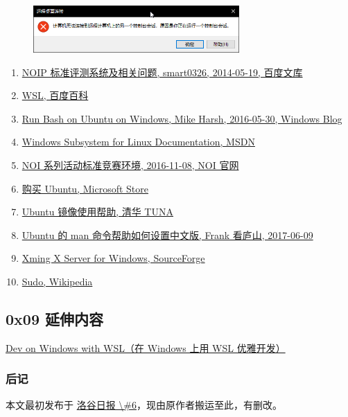 \begin{figure}[htbp]
\centering
\includegraphics[width=0.7\textwidth]{docs/intro/images/WSL12.png} 

\end{figure}



\begin{enumerate}
\item \href{https://wenku.baidu.com/view/8246d96cdd36a32d72758143.html}{NOIP 标准评测系统及相关问题, smart0326, 2014-05-19, 百度文库}         
\item \href{https://baike.baidu.com/item/wsl/20359185}{WSL, 百度百科}        
\item \href{https://blogs.windows.com/buildingapps/2016/03/30/run-bash-on-ubuntu-on-windows/#cie8WdR3uSjgR5Ru.97}{Run Bash on Ubuntu on Windows, Mike Harsh, 2016-05-30, Windows Blog}         
\item \href{https://docs.microsoft.com/zh-cn/windows/wsl/about}{Windows Subsystem for Linux Documentation, MSDN}      
\item \href{http://www.noi.cn/2016-11-08-03-42-01}{NOI 系列活动标准竞赛环境, 2016-11-08, NOI 官网}      
\item \href{https://www.microsoft.com/zh-cn/p/ubuntu/9nblggh4msv6}{购买 Ubuntu, Microsoft Store}      
\item \href{https://mirrors.tuna.tsinghua.edu.cn/help/ubuntu/}{Ubuntu 镜像使用帮助, 清华 TUNA}      
\item \href{https://blog.csdn.net/qq_14989227/article/details/72954523}{Ubuntu 的 man 命令帮助如何设置中文版, Frank 看庐山, 2017-06-09}      
\item \href{https://sourceforge.net/projects/xming/}{Xming X Server for Windows, SourceForge}       
\item \href{https://zh.wikipedia.org/wiki/Sudo}{Sudo, Wikipedia}       
\end{enumerate}

\subsection{0x09 延伸内容}

\href{https://spencerwoo.com/dowww/}{Dev on Windows with WSL（在 Windows 上用 WSL 优雅开发）}

\subsubsection{后记}

本文最初发布于 \href{https://www.luogu.org/discuss/show/48491}{洛谷日报 \textbackslash{}\#6}，现由原作者搬运至此，有删改。      
